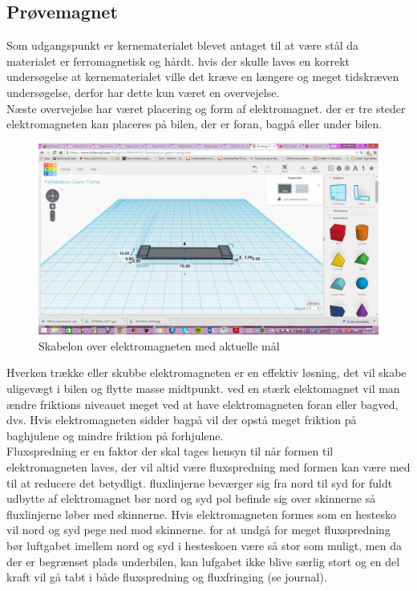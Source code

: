 \subsection{Prøvemagnet}
Som udgangspunkt er kernematerialet blevet antaget til at være stål da materialet er ferromagnetisk og hårdt. hvis der skulle laves en korrekt undersøgelse at kernematerialet ville det kræve en længere og meget tidskræven undersøgelse, derfor har dette kun været en overvejelse. \\
Næste overvejelse har været placering og form af elektromagnet. der er tre steder elektromagneten kan placeres på bilen, der er foran, bagpå eller under bilen.\\
\begin{figure}
\center
\includegraphics[scale=0.17]{./Graphics/Elektromagnet_2D}
\caption{Skabelon over elektromagneten med aktuelle mål}
\label{Elektromagnet_skabelon}
\end{figure}

Hverken trække eller skubbe elektromagneten er en effektiv løsning, det vil skabe uligevægt i bilen og flytte masse midtpunkt. ved en stærk elektomagnet vil man ændre friktions niveauet meget ved at have elektromagneten foran eller bagved, dvs. Hvis elektromagneten sidder bagpå vil der opstå meget friktion på baghjulene og mindre friktion på forhjulene.\\
Fluxspredning er en faktor der skal tages hensyn til når formen til elektromagneten laves, der vil altid være fluxspredning med formen kan være med til at reducere det betydligt. fluxlinjerne beværger sig fra nord til syd for fuldt udbytte af elektromagnet bør nord og syd pol befinde sig over skinnerne så fluxlinjerne løber med skinnerne. Hvis elektromagneten formes som en hestesko vil nord og syd pege ned mod skinnerne. for at undgå for meget fluxspredning bør luftgabet imellem nord og syd i hesteskoen være så stor som muligt, men da der er begrænset plads underbilen, kan lufgabet ikke blive særlig stort og en del kraft vil gå tabt i både fluxspredning og fluxfringing (se journal).\\

